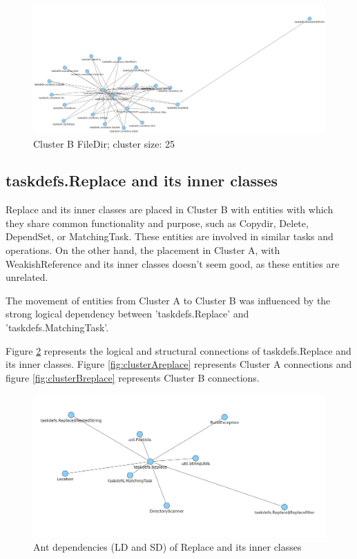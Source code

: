 \documentclass[conference]{IEEEtran}
\begin{document}
\begin{figure}
\centering
\includegraphics[width=\columnwidth]{cluster_filedirSDLD.PNG}
\caption{Cluster B FileDir; cluster size: 25}
\label{fig:clusterBfiledir}
\centering
\end{figure}

\subsection{ taskdefs.Replace and its inner classes}

Replace and its inner classes are placed in Cluster B with entities with which they share common functionality and purpose, such as Copydir, Delete, DependSet, or MatchingTask. These entities are involved in similar tasks and operations. On the other hand, the placement in Cluster A, with WeakishReference and its inner classes doesn't seem good, as these entities are unrelated. 

The movement of entities from Cluster A to Cluster B was influenced by the strong logical dependency between 'taskdefs.Replace' and 'taskdefs.MatchingTask'.

Figure \ref{fig:dep_replace} represents the logical and structural connections of taskdefs.Replace and its inner classes. Figure \ref{fig:clusterAreplace} represents Cluster A connections and figure \ref{fig:clusterBreplace} represents Cluster B connections.

\begin{figure}
\centering
\includegraphics[width=\columnwidth]{dep_replace.png}
\caption{Ant dependencies (LD and SD) of Replace and its inner classes}
\label{fig:dep_replace}
\centering
\end{figure}
\end{document}
